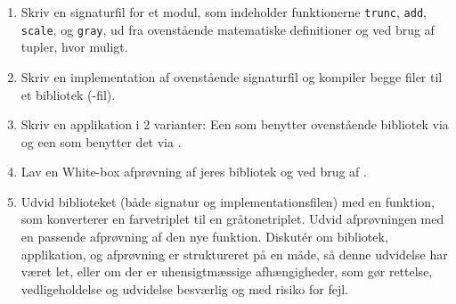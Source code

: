 \documentclass[a4paper,12pt]{article}
\begin{document}
\begin{enumerate}[label=4ø.\arabic*,start=0]
\item Skriv en signaturfil for et modul, som indeholder funktionerne \lstinline{trunc}, \lstinline{add}, \lstinline{scale}, og \lstinline{gray}, ud fra ovenstående matematiske definitioner og ved brug af tupler, hvor muligt.
\item Skriv en implementation af ovenstående signaturfil og kompiler begge filer til et bibliotek (-fil).
\item Skriv en applikation i 2 varianter: Een som benytter ovenstående bibliotek via  og een som benytter det via .
\item Lav en White-box afprøvning af jeres bibliotek og ved brug af .
\item Udvid biblioteket (både signatur og implementationsfilen) med en funktion, som konverterer en farvetriplet til en gråtonetriplet. Udvid afprøvningen med en passende afprøvning af den nye funktion. Diskut\'{e}r om bibliotek, applikation, og afprøvning er struktureret på en måde, så denne udvidelse har været let, eller om der er uhensigtmæssige afhængigheder, som gør rettelse, vedligeholdelse og udvidelse besværlig og med risiko for fejl.
\end{enumerate}
\end{document}
